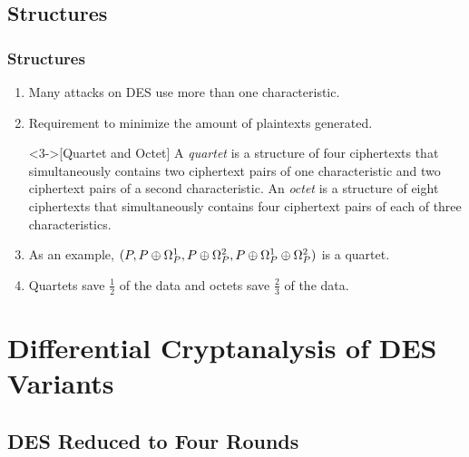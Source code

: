 \documentclass{beamer}
\begin{document}
    \subsection{Structures}
    \label{subsec:structures}

    \begin{frame}
        \frametitle{Structures}
        \begin{enumerate}
            \item<1-> Many attacks on DES use more than one characteristic.
            \item<2-> Requirement to minimize the amount of plaintexts generated.
            \begin{definition}<3->[Quartet and Octet]
                A \emph{quartet} is a structure of four ciphertexts that
                simultaneously contains two ciphertext pairs of one
                characteristic and two ciphertext pairs of a second
                characteristic. An \emph{octet} is a structure of eight
                ciphertexts that simultaneously contains four ciphertext pairs
                of each of three characteristics.
            \end{definition}
            \item<3-> As an example, \((P, P \oplus \Omega_P^1, P \oplus
            \Omega_P^2, P \oplus \Omega_P^1 \oplus \Omega_P^2)\) is a quartet.
            \item<4-> Quartets save \(\frac{1}{2}\) of the data and octets save
            \(\frac{2}{3}\) of the data.
        \end{enumerate}
    \end{frame}

    \section[Cryptanalysis]{Differential Cryptanalysis of DES Variants}
    \label{sec:cryptanalysis}

    \subsection{DES Reduced to Four Rounds}
    \label{subsec:des-4rd}
\end{document}
